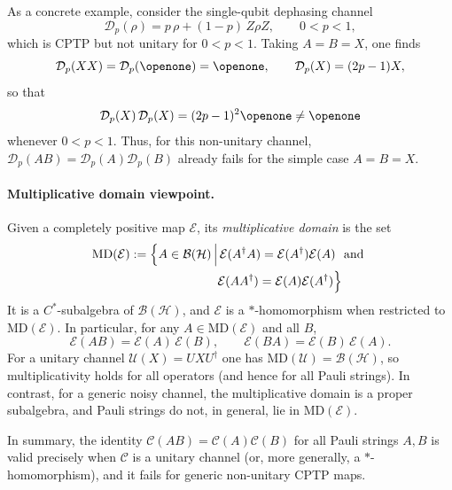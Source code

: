 \documentclass[%
 reprint,
 amsmath,amssymb,
 aps,
]{revtex4-2}
\begin{document}
As a concrete example, consider the single-qubit dephasing channel
\begin{equation}
  \mathcal{D}_p(\rho) = p\,\rho + (1-p)\,Z\rho Z,
  \qquad 0<p<1,
\end{equation}
which is CPTP but not unitary for $0<p<1$.
Taking $A=B=X$, one finds
\begin{equation}
  \mathcal{D}_p(XX) = \mathcal{D}_p(\openone) = \openone,
  \qquad
  \mathcal{D}_p(X) = (2p-1)X,
\end{equation}
so that
\begin{equation}
  \mathcal{D}_p(X)\,\mathcal{D}_p(X) = (2p-1)^2 \openone \neq \openone
\end{equation}
whenever $0<p<1$.
Thus, for this non-unitary channel,
$\mathcal{D}_p(AB)=\mathcal{D}_p(A)\mathcal{D}_p(B)$ already fails for
the simple case $A=B=X$.

\paragraph{Multiplicative domain viewpoint.}
Given a completely positive map $\mathcal{E}$, its \emph{multiplicative
domain} is the set
\begin{equation}
\begin{split}
    \mathrm{MD}(\mathcal{E})
  := \Bigl\{A \in \mathcal{B}(\mathcal{H}) \,\Big|&\,
  \mathcal{E}(A^{\dagger}A)
  = \mathcal{E}(A^{\dagger})\mathcal{E}(A)
  \ \text{ and }\\
  &\mathcal{E}(AA^{\dagger})
  = \mathcal{E}(A)\mathcal{E}(A^{\dagger})\Bigr\}
\end{split}
\end{equation}
It is a $C^{*}$-subalgebra of $\mathcal{B}(\mathcal{H})$, and
$\mathcal{E}$ is a $*$-homomorphism when restricted to
$\mathrm{MD}(\mathcal{E})$.
In particular, for any $A\in\mathrm{MD}(\mathcal{E})$ and all $B$,
\begin{equation}
  \mathcal{E}(AB) = \mathcal{E}(A)\,\mathcal{E}(B),
  \qquad
  \mathcal{E}(BA) = \mathcal{E}(B)\,\mathcal{E}(A).
\end{equation}
For a unitary channel $\mathcal{U}(X)=UXU^{\dagger}$ one has
$\mathrm{MD}(\mathcal{U})=\mathcal{B}(\mathcal{H})$, so multiplicativity holds for all operators (and hence for all Pauli strings). In contrast, for a generic noisy channel, the multiplicative domain is a proper subalgebra, and Pauli strings do not, in general, lie in
$\mathrm{MD}(\mathcal{E})$.

In summary, the identity $\mathcal{C}(AB)=\mathcal{C}(A)\mathcal{C}(B)$ for all Pauli strings $A,B$ is valid precisely when $\mathcal{C}$ is a unitary channel (or, more generally, a $*$-homomorphism), and it fails for generic non-unitary CPTP maps.
\end{document}
